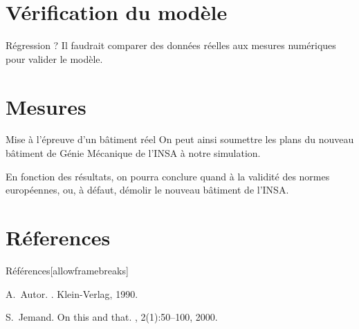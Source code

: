 \documentclass[11pt]{beamer}
\begin{document}
\section{Vérification du modèle}
\begin{frame}{Régression ?}
Il faudrait comparer des données réelles aux mesures numériques pour valider le modèle.
\end{frame}

\section{Mesures}
\begin{frame}{Mise à l'épreuve d'un bâtiment réel}
On peut ainsi soumettre les plans du nouveau bâtiment de Génie Mécanique de l'INSA à notre simulation.\\
\vspace{1cm}

En fonction des résultats, on pourra conclure quand à la validité des normes européennes, ou, à défaut, démolir le nouveau bâtiment de l'INSA.
\end{frame}

\section{Réferences}
\begin{frame}{Références}[allowframebreaks]
\footnotesize
    
  \begin{thebibliography}{10}    
  \beamertemplatebookbibitems
  
    A.~Autor.
    .
    \newblock Klein-Verlag, 1990.

  \beamertemplatearticlebibitems

    S.~Jemand.
    \newblock On this and that.
    , 2(1):50--100, 2000.

  \end{thebibliography}
\end{frame}
\end{document}
